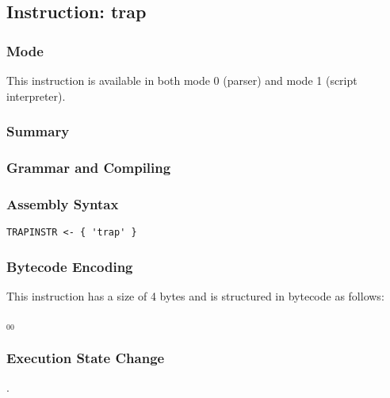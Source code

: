 \subsection{Instruction: trap}

\subsubsection{Mode}
This instruction is available in both mode 0 (parser) and mode 1 (script interpreter).
\subsubsection{Summary}


\subsubsection{Grammar and Compiling}


\subsubsection{Assembly Syntax}

\begin{myquote}
\begin{verbatim}
TRAPINSTR <- { 'trap' }
\end{verbatim}
\end{myquote}

\subsubsection{Bytecode Encoding}

This instruction has a size of 4 bytes and is structured in bytecode as follows:

$_{00}$\ 


\subsubsection{Execution State Change}

.


